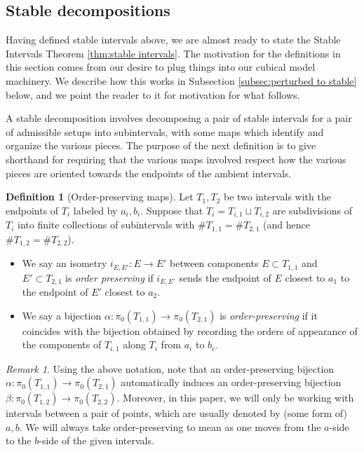 \documentclass{amsart}
\theoremstyle{definition}
\newtheorem{definition}[theorem]{Definition}
\theoremstyle{remark}
\newtheorem{remark}[theorem]{Remark}
\theoremstyle{definition}
\begin{document}
\subsection{Stable decompositions}\label{subsec:stable decomp}

Having defined stable intervals above, we are almost ready to state the Stable Intervals Theorem \ref{thm:stable intervals}.  The motivation for the definitions in this section comes from our desire to plug things into our cubical model machinery.  We describe how this works in Subsection \ref{subsec:perturbed to stable} below, and we point the reader to it for motivation for what follows.

A stable decomposition involves decomposing a pair of stable intervals for a pair of admissible setups into subintervals, with some maps which identify and organize the various pieces.  The purpose of the next definition is to give shorthand for requiring that the various maps involved respect how the various pieces are oriented towards the endpoints of the ambient intervals.

\begin{definition}[Order-preserving maps]\label{defn:order preserving}
Let $T_1, T_2$ be two intervals with the endpoints of $T_i$ labeled by $a_i,b_i$.  Suppose that $T_i = T_{i,1} \sqcup T_{i,2}$ are subdivisions of $T_i$ into finite collections of subintervals with $\# T_{1,1} = \#T_{2,1}$ (and hence $\#T_{1,2} = \#T_{2,2}$).

\begin{itemize}
\item We say an isometry $i_{E,E'}:E \to E'$ between components $E \subset T_{1,1}$ and $E' \subset T_{2,1}$ is \emph{order preserving} if $i_{E,E'}$ sends the endpoint of $E$ closest to $a_1$ to the endpoint of $E'$ closest to $a_2$.
\item We say a bijection $\alpha:\pi_0(T_{1,1}) \to \pi_0(T_{2,1})$ is \emph{order-preserving} if it coincides with the bijection obtained by recording the orders of appearance of the components of $T_{i,1}$ along $T_i$ from $a_i$ to $b_i$.
\end{itemize}
\end{definition}

\begin{remark}\label{rem:order preserving}
Using the above notation, note that an order-preserving bijection $\alpha:\pi_0(T_{1,1}) \to \pi_0(T_{2,1})$ automatically induces an order-preserving bijection $\beta:\pi_0(T_{1,2}) \to \pi_0(T_{2,2})$.  Moreover, in this paper, we will only be working with intervals between a pair of points, which are usually denoted by (some form of) $a,b$.  We will always take order-preserving to mean as one moves from the $a$-side to the $b$-side of the given intervals.
\end{remark}
\end{document}
